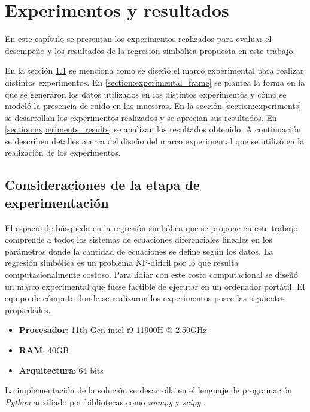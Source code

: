 \chapter{Experimentos y resultados}\label{chapter:results}

En este capítulo se presentan los experimentos realizados para evaluar el desempeño y los resultados de la regresión simbólica propuesta en este trabajo.

En la sección \ref{section:experimental_considerations} se menciona como se diseñó el marco experimental para realizar distintos experimentos. En \ref{section:experimental_frame} se plantea la forma en la que se generaron los datos utilizados en los distintos experimentos y cómo se modeló la presencia de ruido en las muestras. En la sección \ref{section:experiments} se desarrollan los experimentos realizados y se aprecian sus resultados. En \ref{section:experiments_results} se analizan los resultados obtenido. A continuación se describen detalles acerca del diseño del marco experimental que se utilizó en la realización de los experimentos.

\section{Consideraciones de la etapa de experimentación}\label{section:experimental_considerations}

El espacio de búsqueda en la regresión simbólica que se propone en este trabajo comprende a todos los sistemas de ecuaciones diferenciales lineales en los parámetros donde la cantidad de ecuaciones se define según los datos. La regresión simbólica es un problema NP-difícil por lo que resulta computacionalmente costoso. Para lidiar con este costo computacional se diseñó un marco experimental que fuese factible de ejecutar en un ordenador portátil. El equipo de cómputo donde se realizaron los experimentos posee las siguientes propiedades.

\begin{itemize}
    \item \textbf{Procesador}: 11th Gen intel i9-11900H @ 2.50GHz
    \item \textbf{RAM}: 40GB
    \item \textbf{Arquitectura}: 64 bits
\end{itemize}

La implementación de la solución se desarrolla en el lenguaje de programación \emph{Python} auxiliado por bibliotecas como \emph{numpy} \cite{harris2020array} y \emph{scipy} \cite{2020SciPy-NMeth}.

